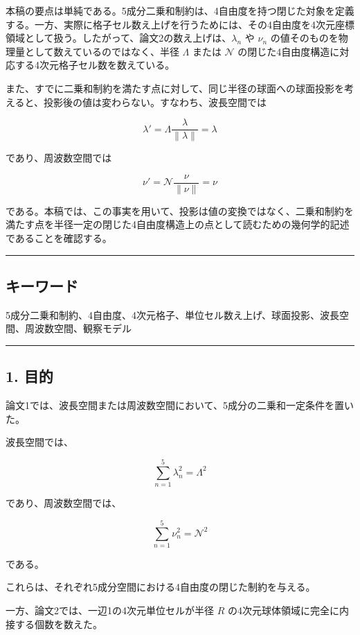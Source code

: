 \documentclass[
]{ltjsarticle}
\begin{document}
本稿の要点は単純である。5成分二乗和制約は、4自由度を持つ閉じた対象を定義する。一方、実際に格子セル数え上げを行うためには、その4自由度を4次元座標領域として扱う。したがって、論文2の数え上げは、\(\lambda_n\)
や \(\nu_n\) の値そのものを物理量として数えているのではなく、半径
\(\Lambda\) または \(\mathcal{N}\)
の閉じた4自由度構造に対応する4次元格子セル数を数えている。

また、すでに二乗和制約を満たす点に対して、同じ半径の球面への球面投影を考えると、投影後の値は変わらない。すなわち、波長空間では

\[
\lambda'=\Lambda\frac{\lambda}{\|\lambda\|}=\lambda
\]

であり、周波数空間では

\[
\nu'=\mathcal{N}\frac{\nu}{\|\nu\|}=\nu
\]

である。本稿では、この事実を用いて、投影は値の変換ではなく、二乗和制約を満たす点を半径一定の閉じた4自由度構造上の点として読むための幾何学的記述であることを確認する。

\begin{center}\rule{0.5\linewidth}{0.5pt}\end{center}

\subsection{キーワード}\label{ux30adux30fcux30efux30fcux30c9}

5成分二乗和制約、4自由度、4次元格子、単位セル数え上げ、球面投影、波長空間、周波数空間、観察モデル

\begin{center}\rule{0.5\linewidth}{0.5pt}\end{center}

\subsection{1. 目的}\label{ux76eeux7684}

論文1では、波長空間または周波数空間において、5成分の二乗和一定条件を置いた。

波長空間では、

\[
\sum_{n=1}^{5}\lambda_n^2=\Lambda^2
\]

であり、周波数空間では、

\[
\sum_{n=1}^{5}\nu_n^2=\mathcal{N}^2
\]

である。

これらは、それぞれ5成分空間における4自由度の閉じた制約を与える。

一方、論文2では、一辺1の4次元単位セルが半径 \(R\)
の4次元球体領域に完全に内接する個数を数えた。
\end{document}
